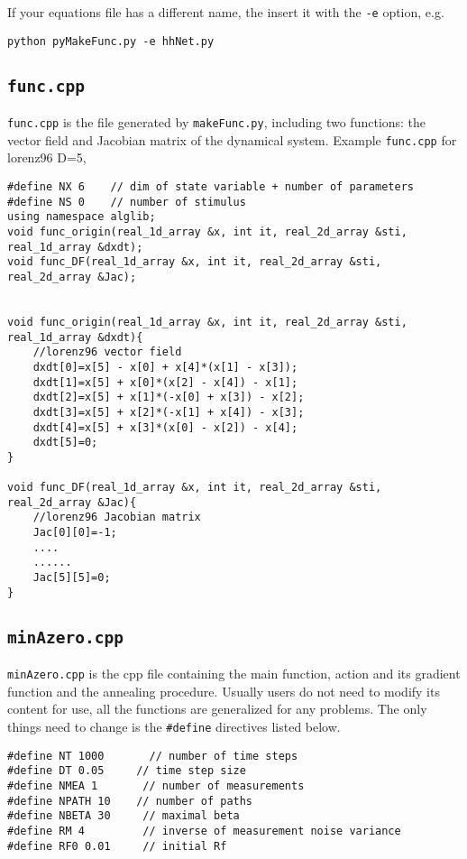 \documentclass[11pt]{article}
\begin{document}
If your equations file has a different name, the insert it with the \texttt{-e} option, e.g.
\begin{verbatim}
python pyMakeFunc.py -e hhNet.py
\end{verbatim}

\subsection{\texttt{func.cpp}}
\texttt{func.cpp} is the file generated by \texttt{makeFunc.py}, including two functions: the vector field and Jacobian matrix of the dynamical system. Example \texttt{func.cpp} for lorenz96 D=5,
\begin{verbatim}
#define NX 6	// dim of state variable + number of parameters
#define NS 0	// number of stimulus
using namespace alglib;
void func_origin(real_1d_array &x, int it, real_2d_array &sti, real_1d_array &dxdt);
void func_DF(real_1d_array &x, int it, real_2d_array &sti, real_2d_array &Jac);


void func_origin(real_1d_array &x, int it, real_2d_array &sti, real_1d_array &dxdt){
	//lorenz96 vector field
	dxdt[0]=x[5] - x[0] + x[4]*(x[1] - x[3]);
	dxdt[1]=x[5] + x[0]*(x[2] - x[4]) - x[1];
	dxdt[2]=x[5] + x[1]*(-x[0] + x[3]) - x[2];
	dxdt[3]=x[5] + x[2]*(-x[1] + x[4]) - x[3];
	dxdt[4]=x[5] + x[3]*(x[0] - x[2]) - x[4];
	dxdt[5]=0;
}

void func_DF(real_1d_array &x, int it, real_2d_array &sti, real_2d_array &Jac){
	//lorenz96 Jacobian matrix
	Jac[0][0]=-1;
 	....
 	......
	Jac[5][5]=0;
}
\end{verbatim}
\subsection{\texttt{minAzero.cpp}}
\texttt{minAzero.cpp} is the cpp file containing the main function, action and its gradient function and the annealing procedure.  Usually users do not need to modify its content for use, all the functions are generalized for any problems. The only things need to change is the \texttt{\#define} directives listed below.
\begin{verbatim} 
#define NT 1000       // number of time steps
#define DT 0.05     // time step size
#define NMEA 1       // number of measurements
#define NPATH 10    // number of paths
#define NBETA 30     // maximal beta
#define RM 4         // inverse of measurement noise variance
#define RF0 0.01     // initial Rf
\end{verbatim}
\end{document}
